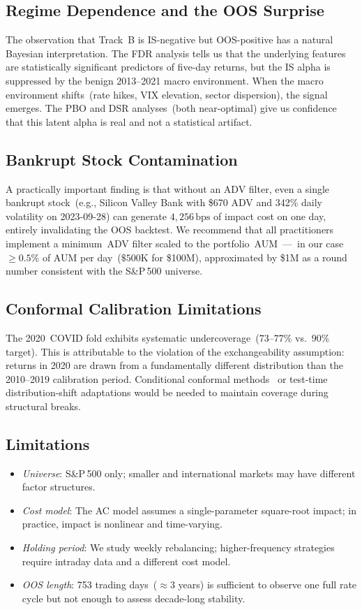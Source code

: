 \documentclass[journal]{IEEEtran}
\newcommand{\bps}{\,\mathrm{bps}}
\begin{document}
\subsection{Regime Dependence and the OOS Surprise}
The observation that Track~B is IS-negative but OOS-positive has a
natural Bayesian interpretation.
The FDR analysis tells us that the underlying features are
statistically significant predictors of five-day returns, but the
IS alpha is suppressed by the benign 2013--2021 macro environment.
When the macro environment shifts~(rate hikes, VIX elevation, sector
dispersion), the signal emerges.
The PBO and DSR analyses~(both near-optimal) give us confidence that
this latent alpha is real and not a statistical artifact.

\subsection{Bankrupt Stock Contamination}
A practically important finding is that without an ADV filter, even
a single bankrupt stock~(e.g., Silicon Valley Bank with \$670 ADV
and 342\% daily volatility on 2023-09-28) can generate
$4{,}256\bps$ of impact cost on one day, entirely invalidating the
OOS backtest.
We recommend that all practitioners implement a minimum~ADV filter
scaled to the portfolio~AUM~---~in our case~$\geq 0.5\%$ of AUM
per day~($\$500$K for \$100M), approximated by \$1M as a round
number consistent with the S\&P\,500 universe.

\subsection{Conformal Calibration Limitations}
The 2020~COVID fold exhibits systematic undercoverage~($73$--$77\%$
vs.\ $90\%$ target).
This is attributable to the violation of the exchangeability
assumption: returns in 2020 are drawn from a fundamentally
different distribution than the 2010--2019 calibration period.
Conditional conformal methods~\cite{barber2023conformal} or
test-time distribution-shift adaptations would be needed to maintain
coverage during structural breaks.

\subsection{Limitations}
\begin{itemize}
  \item \emph{Universe}: S\&P\,500 only; smaller and international
        markets may have different factor structures.
  \item \emph{Cost model}: The AC model assumes a single-parameter
        square-root impact; in practice, impact is nonlinear and
        time-varying.
  \item \emph{Holding period}: We study weekly rebalancing; higher-frequency
        strategies require intraday data and a different cost model.
  \item \emph{OOS length}: 753 trading days~($\approx3$ years) is
        sufficient to observe one full rate cycle but not enough to
        assess decade-long stability.
\end{itemize}
\end{document}
